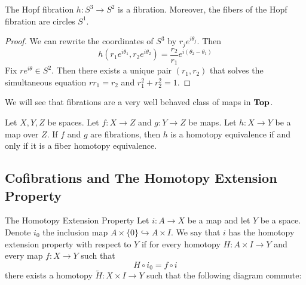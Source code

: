 \documentclass[a4paper]{article}
\begin{document}
\begin{eg}{}{} The Hopf fibration $h:S^3\to S^2$ is a fibration. Moreover, the fibers of the Hopf fibration are circles $S^1$. \tcbline
\begin{proof}
We can rewrite the coordinates of $S^3$ by $r_je^{i\theta_j}$. Then $$h(r_1e^{i\theta_1},r_2e^{i\theta_2})=\frac{r_2}{r_1}e^{i(\theta_2-\theta_1)}$$ Fix $re^{i\theta}\in S^2$. Then there exists a unique pair $(r_1,r_2)$ that solves the simultaneous equation $rr_1=r_2$ and $r_1^2+r_2^2=1$. 
\end{proof}
\end{eg}

We will see that fibrations are a very well behaved class of maps in $\bold{Top}$. 

\begin{lmm}{}{} Let $X,Y,Z$ be spaces. Let $f:X\to Z$ and $g:Y\to Z$ be maps. Let $h:X\to Y$ be a map over $Z$. If $f$ and $g$ are fibrations, then $h$ is a homotopy equivalence if and only if it is a fiber homotopy equivalence. 
\end{lmm}

\subsection{Cofibrations and The Homotopy Extension Property}
\begin{defn}{The Homotopy Extension Property}{} Let $i:A\to X$ be a map and let $Y$ be a space. Denote $i_0$ the inclusion map $A\times\{0\}\hookrightarrow A\times I$. We say that $i$ has the homotopy extension property with respect to $Y$ if for every homotopy $H:A\times I\to Y$ and every map $f:X\to Y$ such that $$H\circ i_0=f\circ i$$ there exists a homotopy $\widetilde{H}:X\times I\to Y$ such that the following diagram commute: \\~\\
\\~\\
\end{defn}
\end{document}
